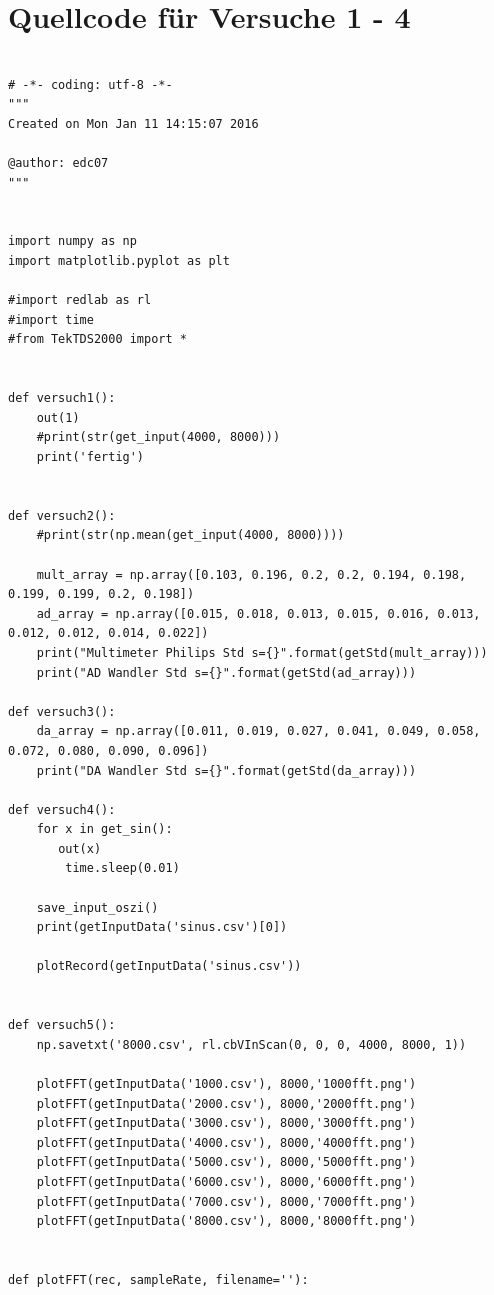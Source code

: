 \documentclass[12pt,oneside,a4paper]{report}
\begin{document}
\section{Quellcode für Versuche 1 - 4}
\label{chap:APPENDIX_SOURCECODE}
\begin{lstlisting}[style=PYTHON, frame=single, caption=QuellCodeV1 bis V4, captionpos=b, label=lst:Code]

# -*- coding: utf-8 -*-
"""
Created on Mon Jan 11 14:15:07 2016

@author: edc07
"""


import numpy as np
import matplotlib.pyplot as plt

#import redlab as rl
#import time
#from TekTDS2000 import *


def versuch1():
    out(1)
    #print(str(get_input(4000, 8000)))
    print('fertig')


def versuch2():
    #print(str(np.mean(get_input(4000, 8000))))

    mult_array = np.array([0.103, 0.196, 0.2, 0.2, 0.194, 0.198, 0.199, 0.199, 0.2, 0.198])
    ad_array = np.array([0.015, 0.018, 0.013, 0.015, 0.016, 0.013, 0.012, 0.012, 0.014, 0.022])
    print("Multimeter Philips Std s={}".format(getStd(mult_array)))
    print("AD Wandler Std s={}".format(getStd(ad_array)))

def versuch3():
    da_array = np.array([0.011, 0.019, 0.027, 0.041, 0.049, 0.058, 0.072, 0.080, 0.090, 0.096])
    print("DA Wandler Std s={}".format(getStd(da_array)))

def versuch4():    
    for x in get_sin():
       out(x)
        time.sleep(0.01)
    
    save_input_oszi()
    print(getInputData('sinus.csv')[0])
    
    plotRecord(getInputData('sinus.csv'))


def versuch5():
    np.savetxt('8000.csv', rl.cbVInScan(0, 0, 0, 4000, 8000, 1))
    
    plotFFT(getInputData('1000.csv'), 8000,'1000fft.png')
    plotFFT(getInputData('2000.csv'), 8000,'2000fft.png')
    plotFFT(getInputData('3000.csv'), 8000,'3000fft.png')
    plotFFT(getInputData('4000.csv'), 8000,'4000fft.png')
    plotFFT(getInputData('5000.csv'), 8000,'5000fft.png')
    plotFFT(getInputData('6000.csv'), 8000,'6000fft.png')
    plotFFT(getInputData('7000.csv'), 8000,'7000fft.png')
    plotFFT(getInputData('8000.csv'), 8000,'8000fft.png')


def plotFFT(rec, sampleRate, filename=''):
    

\end{lstlisting}
\end{document}
